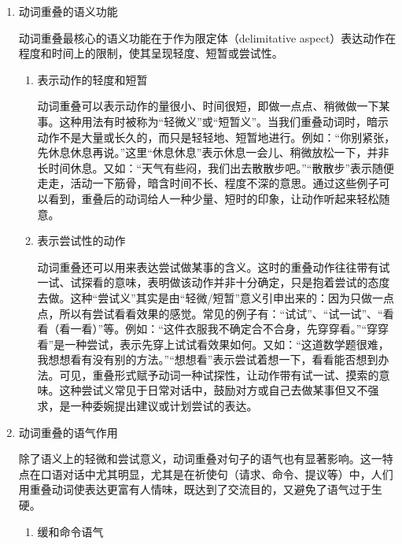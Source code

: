 \documentclass[10pt]{ctexart}
\begin{document}
\begin{enumerate}
\begin{enumerate}[label=(\arabic*)]
        \item 动词类型的限制
        
        并不是所有动词都可以重叠，典型可重叠的是[+可控制]、[+可持续]、[−固定结果]的动作动词（如看、想、找、聊、玩等），不太容易重叠的是本身就瞬间完成/结果性的动词（如死、到、输等）。同时，动词重叠也不可用于已完成的动作（*我昨天看看了电影。），也不可用来表示持续性的动作（*他一直在看看书。）。
    \end{enumerate}
    
    \item 动词重叠的语义功能
    
    动词重叠最核心的语义功能在于作为限定体（delimitative aspect）表达动作在程度和时间上的限制，使其呈现轻度、短暂或尝试性。
    \begin{enumerate}[label=(\arabic*)]
        \item 表示动作的轻度和短暂
        
        动词重叠可以表示动作的量很小、时间很短，即做一点点、稍微做一下某事。这种用法有时被称为``轻微义''或``短暂义''。当我们重叠动词时，暗示动作不是大量或长久的，而只是轻轻地、短暂地进行。例如：``你别紧张，先休息休息再说。''这里``休息休息''表示休息一会儿、稍微放松一下，并非长时间休息。又如：``天气有些闷，我们出去散散步吧。''``散散步''表示随便走走，活动一下筋骨，暗含时间不长、程度不深的意思。通过这些例子可以看到，重叠后的动词给人一种少量、短时的印象，让动作听起来轻松随意。

        \item 表示尝试性的动作

        动词重叠还可以用来表达尝试做某事的含义。这时的重叠动作往往带有试一试、试探看的意味，表明做该动作并非十分确定，只是抱着尝试的态度去做。这种``尝试义''其实是由``轻微/短暂''意义引申出来的：因为只做一点点，所以有尝试看看效果的感觉。常见的例子有：``试试''、``试一试''、``看看（看一看）''等。例如：``这件衣服我不确定合不合身，先穿穿看。''``穿穿看''是一种尝试，表示先穿上试试看效果如何。又如：``这道数学题很难，我想想看有没有别的方法。''``想想看''表示尝试着想一下，看看能否想到办法。可见，重叠形式赋予动词一种试探性，让动作带有试一试、摸索的意味。这种尝试义常见于日常对话中，鼓励对方或自己去做某事但又不强求，是一种委婉提出建议或计划尝试的表达。
    \end{enumerate}
    
    \item 动词重叠的语气作用
    
    除了语义上的轻微和尝试意义，动词重叠对句子的语气也有显著影响。这一特点在口语对话中尤其明显，尤其是在祈使句（请求、命令、提议等）中，人们用重叠动词使表达更富有人情味，既达到了交流目的，又避免了语气过于生硬。
    \begin{enumerate}[label=(\arabic*)]
        \item 缓和命令语气
        

\end{enumerate}
\end{enumerate}
\end{document}
